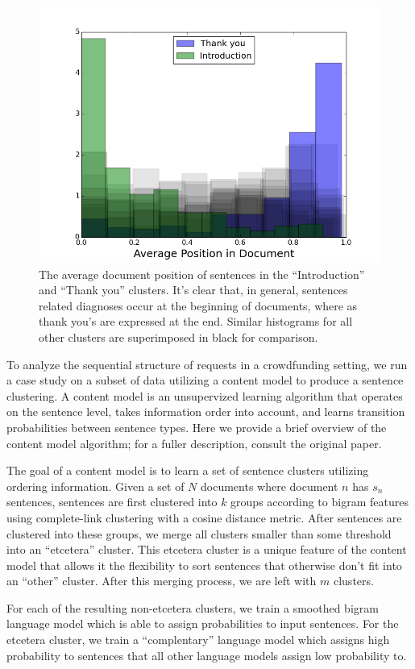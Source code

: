 \documentclass[letterpaper]{article}
\begin{document}
\begin{figure}
\centering
\includegraphics[width=.45\textwidth]{figures/docpos.png}
\caption{The average document position of sentences in the ``Introduction'' and ``Thank you'' clusters. It's clear that, in general, sentences related diagnoses occur at the beginning of documents, where as thank you's are expressed at the end. Similar histograms for all other clusters are superimposed in black for comparison.}
\label{fig:docpos}
\end{figure}

To analyze the sequential structure of requests in a crowdfunding setting, we run a case study on a subset of data utilizing a content model \cite{barzilay2004catching} to produce a sentence clustering. A content model is an unsupervized learning algorithm that operates on the sentence level, takes information order into account, and learns transition probabilities between sentence types. Here we provide a brief overview of the content model algorithm; for a fuller description, consult the original paper.

The goal of a content model is to learn a set of sentence clusters utilizing ordering information. Given a set of $N$ documents where document $n$ has $s_n$ sentences, sentences are first clustered into $k$ groups according to bigram features using complete-link clustering with a cosine distance metric. After sentences are clustered into these groups, we merge all clusters smaller than some threshold into an ``etcetera'' cluster. This etcetera cluster is a unique feature of the content model that allows it the flexibility to sort sentences that otherwise don't fit into an ``other'' cluster. After this merging process, we are left with $m$ clusters. 

For each of the resulting non-etcetera clusters, we train a smoothed bigram language model which is able to assign probabilities to input sentences. For the etcetera cluster, we train a ``complentary'' language model which assigns high probability to sentences that all other language models assign low probability to.
\end{document}
